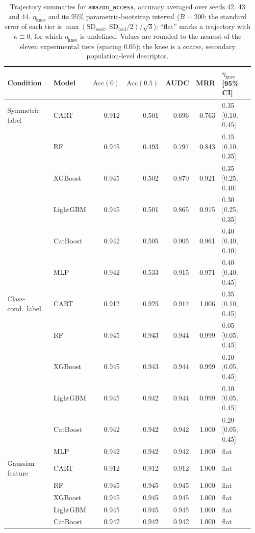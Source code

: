 \documentclass[pdflatex,sn-mathphys]{sn-jnl}
\theoremstyle{thmstyleone}
\begin{document}
\begin{table}[htbp]
\centering
\scriptsize
\setlength{\tabcolsep}{3.5pt}
\caption{Trajectory summaries for \texttt{amazon\_access}, accuracy averaged over seeds 42, 43 and 44. $\eta_{\mathrm{knee}}$ and its 95\% parametric-bootstrap interval ($B=200$; the standard error of each tier is $\max(\mathrm{SD}_{\mathrm{seed}},\,\mathrm{SD}_{\mathrm{fold}}/2)/\sqrt3$); ``flat'' marks a trajectory with $\kappa\equiv 0$, for which $\eta_{\mathrm{knee}}$ is undefined. Values are rounded to the nearest of the eleven experimental tiers (spacing $0.05$); the knee is a coarse, secondary population-level descriptor.}
\label{tab:traj_amazon_access}
\begin{tabular}{@{}llrrrrl@{}}
\toprule
Condition & Model & $\mathrm{Acc}(0)$ & $\mathrm{Acc}(0.5)$ & AUDC & MRR & $\eta_{\mathrm{knee}}$ [95\% CI] \\
\midrule
Symmetric label & CART & 0.912 & 0.501 & 0.696 & 0.763 & 0.35 [0.10, 0.45] \\
 & RF & 0.945 & 0.493 & 0.797 & 0.843 & 0.15 [0.10, 0.35] \\
 & XGBoost & 0.945 & 0.502 & 0.870 & 0.921 & 0.35 [0.25, 0.40] \\
 & LightGBM & 0.945 & 0.501 & 0.865 & 0.915 & 0.30 [0.25, 0.35] \\
 & CatBoost & 0.942 & 0.505 & 0.905 & 0.961 & 0.40 [0.40, 0.40] \\
 & MLP & 0.942 & 0.533 & 0.915 & 0.971 & 0.40 [0.40, 0.45] \\
\midrule
Class-cond.\ label & CART & 0.912 & 0.925 & 0.917 & 1.006 & 0.35 [0.10, 0.45] \\
 & RF & 0.945 & 0.943 & 0.944 & 0.999 & 0.05 [0.05, 0.45] \\
 & XGBoost & 0.945 & 0.943 & 0.944 & 0.999 & 0.10 [0.05, 0.45] \\
 & LightGBM & 0.945 & 0.942 & 0.944 & 0.999 & 0.10 [0.05, 0.45] \\
 & CatBoost & 0.942 & 0.942 & 0.942 & 1.000 & 0.20 [0.05, 0.45] \\
 & MLP & 0.942 & 0.942 & 0.942 & 1.000 & flat \\
\midrule
Gaussian feature & CART & 0.912 & 0.912 & 0.912 & 1.000 & flat \\
 & RF & 0.945 & 0.945 & 0.945 & 1.000 & flat \\
 & XGBoost & 0.945 & 0.945 & 0.945 & 1.000 & flat \\
 & LightGBM & 0.945 & 0.945 & 0.945 & 1.000 & flat \\
 & CatBoost & 0.942 & 0.942 & 0.942 & 1.000 & flat \\

\end{tabular}
\end{table}
\end{document}
